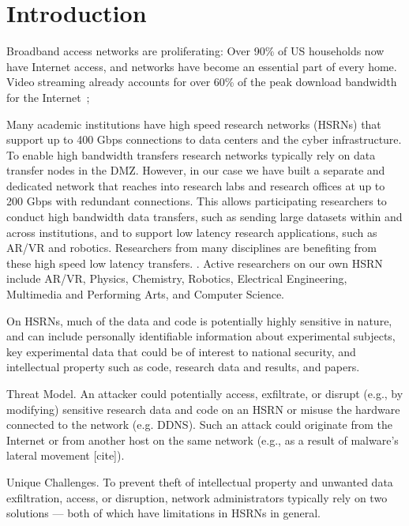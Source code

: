 \begin{center}
{\large \bf \TITLE}
\end{center}

\section{Introduction}

Broadband access networks are proliferating: Over 90\% of US households
now have Internet access, and networks have become an essential part of
every home.  Video streaming already accounts for over 60\% of the peak
download bandwidth for the Internet~\cite{www-bismark};

Many academic institutions have high speed research networks (HSRNs) that support up to 400 Gbps connections to data centers and the cyber infrastructure. To enable high bandwidth transfers research networks typically rely on data transfer nodes in the DMZ. However, in our case we have built a separate and dedicated network that reaches into research labs and research offices at up to 200 Gbps with redundant connections. This allows participating researchers to conduct high bandwidth data transfers, such as sending large datasets within and across institutions, and to support  low latency research applications, such as AR/VR and robotics. Researchers from many disciplines are benefiting from these high speed low latency transfers. . Active researchers on our own HSRN include AR/VR, Physics, Chemistry, Robotics, Electrical Engineering, Multimedia and Performing Arts, and Computer Science.

On HSRNs, much of the data and code is potentially highly sensitive in nature, and can include personally identifiable information about experimental subjects, key experimental data that could be of interest to national security, and intellectual property such as code, research data and results, and papers.

Threat Model. An attacker could potentially access, exfiltrate, or disrupt (e.g., by modifying) sensitive research data and code on an HSRN or misuse the hardware connected to the network (e.g. DDNS). Such an  attack could originate from the Internet or from another host on the same network (e.g., as a result of malware’s lateral movement [cite]).

Unique Challenges. To prevent theft of intellectual property and unwanted data exfiltration, access, or disruption, network administrators typically rely on two solutions — both of which have limitations in HSRNs in general.


